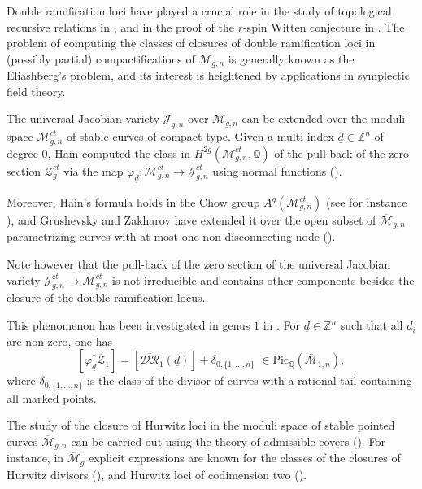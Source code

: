 \documentclass[10pt]{amsart}
\theoremstyle{definition}
\begin{document}
Double ramification loci have played a crucial role in the study of topological recursive relations in \cite{MR1908062}, and in the proof of the $r$-spin Witten conjecture in \cite{MR2722511}. 
The problem of computing the classes of closures of double ramification loci in (possibly partial) compactifications of ${\mathcal{M}}_{g,n}$ is generally known as the Eliashberg's problem, and its interest is heightened by applications in symplectic field theory. 

The universal Jacobian variety $\mathcal{J}_{g,n}$ over ${\mathcal{M}}_{g,n}$ can be extended over the moduli space ${\mathcal{M}}_{g,n}^{ct}$ of stable curves of compact type. Given a multi-index $\underline{d}\in\mathbb{Z}^n$ of degree $0$, Hain computed the class in $H^{2g}({\mathcal{M}}_{g,n}^{ct},\mathbb{Q})$ of the pull-back of the zero section ${\mathcal{Z}}^{ct}_g$ via the map $\varphi_{\underline{d}}\colon {\mathcal{M}}_{g,n}^{ct}\rightarrow \mathcal{J}_{g,n}^{ct}$ using normal functions (\cite{Hain}).

Moreover, Hain's formula holds in the Chow group $A^g({\mathcal{M}}_{g,n}^{ct})$ (see for instance \cite{GZ1}), and Grushevsky and Zakharov have extended it over the open subset of ${\overline{\mathcal{M}}}_{g,n}$ parametrizing curves with at most one non-disconnecting node (\cite{MR3189435}).

Note however that the pull-back of the zero section of the universal Jacobian variety $\mathcal{J}_{g,n}^{ct}\rightarrow {\mathcal{M}}_{g,n}^{ct}$ is not irreducible and contains other components besides the closure of the double ramification locus. 

This phenomenon has been investigated in genus $1$ in \cite{MR3231020}. For $\underline{d}\in\mathbb{Z}^n$ such that all $d_i$ are non-zero, one has
\[
\left[ \varphi_{\underline{d}}^* \overline{\mathcal{Z}}_1\right] = \left[\overline{\mathcal{DR}}_1(\underline{d})\right] +\delta_{0,\{1,\dots,n\}}\,\,\in\textrm{Pic}_\mathbb{Q}({\overline{\mathcal{M}}}_{1,n}),
\]
where $\delta_{0,\{1,\dots,n\}}$ is the class of the divisor of curves with a rational tail containing all marked points.

The study of the closure of Hurwitz loci in the moduli space of stable pointed curves ${\overline{\mathcal{M}}}_{g,n}$ can be carried out using the theory of admissible covers (\cite{MR664324}). For instance, in ${\overline{\mathcal{M}}}_g$ explicit expressions are known for the classes of the closures of Hurwitz divisors (\cite{MR664324}), and Hurwitz loci of codimension two (\cite{MR3109733}).
\end{document}
